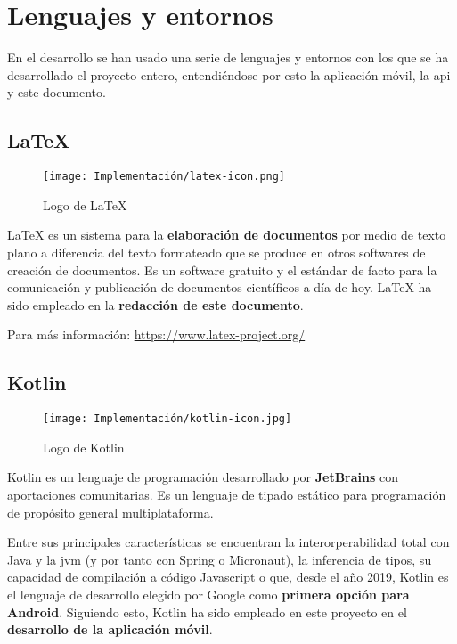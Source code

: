 \section{Lenguajes y entornos}

En el desarrollo se han usado una serie de lenguajes y entornos con los que se ha desarrollado el proyecto entero, entendiéndose por esto la aplicación móvil, la \acrshort{api} y este documento.

\subsection{LaTeX}
\label{lib:latex}

\begin{wrapfigure}[6]{r}{0.2\textwidth}
    \vspace{-20pt}
    \centering
    \texttt{[image: Implementación/latex-icon.png]}
    \vspace{-20pt}
    \caption{Logo de LaTeX}
\end{wrapfigure}

LaTeX es un sistema para la \textbf{elaboración de documentos} por medio de texto plano a diferencia del texto formateado que se produce en otros softwares de creación de documentos. Es un software gratuito y el estándar de facto para la comunicación y publicación de documentos científicos a día de hoy. LaTeX ha sido empleado en la \textbf{redacción de este documento}.

Para más información: \href{https://www.latex-project.org/}{https://www.latex-project.org/}

\subsection{Kotlin}
\label{lib:kotlin}

\begin{wrapfigure}[6]{l}{0.2\textwidth}
    \vspace{-15pt}
    \centering
    \texttt{[image: Implementación/kotlin-icon.jpg]}
    \vspace{-10pt}
    \caption{Logo de Kotlin}
\end{wrapfigure}

Kotlin es un lenguaje de programación desarrollado por \textbf{JetBrains} con aportaciones comunitarias. Es un lenguaje de tipado estático para programación de propósito general multiplataforma. 

Entre sus principales características se encuentran la interorperabilidad total con Java y la \acrshort{jvm} (y por tanto con Spring o Micronaut), la inferencia de tipos, su capacidad de compilación a código Javascript o que, desde el año 2019, Kotlin es el lenguaje de desarrollo elegido por Google como \textbf{primera opción para Android}\cite{kotlin2019}. Siguiendo esto, Kotlin ha sido empleado en este proyecto en el \textbf{desarrollo de la aplicación móvil}.

